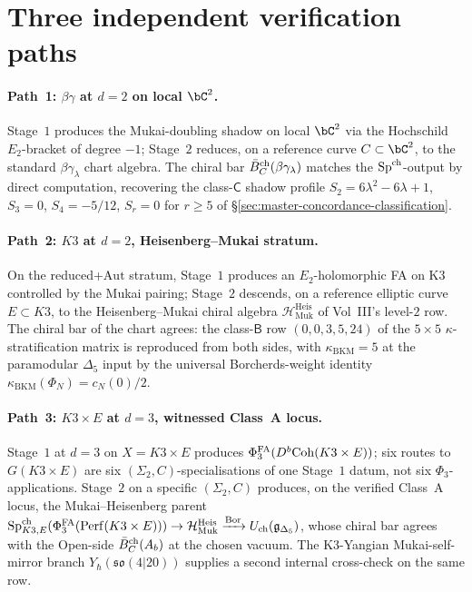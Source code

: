 \section{Three independent verification paths}
\label{sec:vert-level-2-verification}

\paragraph{Path~1: $\beta\gamma$ at $d=2$ on local $\bC^2$.}
Stage~$1$ produces the Mukai-doubling shadow on local $\bC^2$ via the
Hochschild $E_2$-bracket of degree $-1$; Stage~$2$ reduces, on a
reference curve $C\subset\bC^2$, to the standard $\beta\gamma_\lambda$
chart algebra. The chiral bar $\bar{B}^{\mathrm{ch}}_C(\beta\gamma_\lambda)$ matches
the $\mathrm{Sp}^{\mathrm{ch}}$-output by direct computation, recovering the class-$\mathsf{C}$
shadow profile $S_2=6\lambda^2-6\lambda+1$, $S_3=0$, $S_4=-5/12$,
$S_r=0$ for $r\geq 5$ of \S\ref{sec:master-concordance-classification}.

\paragraph{Path~2: $K3$ at $d=2$, Heisenberg--Mukai stratum.}
On the reduced+$\mathrm{Aut}$ stratum, Stage~$1$ produces an
$E_2$-holomorphic FA on K3 controlled by the Mukai pairing; Stage~$2$
descends, on a reference elliptic curve $E\subset K3$, to the
Heisenberg--Mukai chiral algebra $\mathcal H^{\mathrm{Heis}}_{\mathrm{Muk}}$
of Vol~III's level-$2$ row. The chiral bar of the chart agrees: the
class-$\mathsf{B}$ row $(0,0,3,5,24)$ of the $5\times5$
$\kappa$-stratification matrix is reproduced from both sides, with
$\kappa_{\mathrm{BKM}}=5$ at the paramodular $\Delta_5$ input by the
universal Borcherds-weight identity $\kappa_{\mathrm{BKM}}(\Phi_N)=c_N(0)/2$.

\paragraph{Path~3: $K3\times E$ at $d=3$, witnessed Class~A locus.}
Stage~$1$ at $d=3$ on $X=K3\times E$ produces $\Phi^{\mathrm{FA}}_3(D^b\mathrm{Coh}(K3\times E))$;
six routes to $G(K3\times E)$ are six $(\Sigma_2,C)$-specialisations
of one Stage~$1$ datum, not six $\Phi_3$-applications. Stage~$2$ on a
specific $(\Sigma_2,C)$ produces, on the verified Class~A locus, the
Mukai--Heisenberg parent
$\mathrm{Sp}^{\mathrm{ch}}_{K3,E}(\Phi^{\mathrm{FA}}_3(\mathrm{Perf}(K3\times E)))\to\mathcal H^{\mathrm{Heis}}_{\mathrm{Muk}}\xrightarrow{\mathrm{Bor}}U_{\mathrm{ch}}(\mathfrak g_{\Delta_5})$,
whose chiral bar agrees with the Open-side $\bar{B}^{\mathrm{ch}}_C(A_b)$ at the
chosen vacuum. The K3-Yangian Mukai-self-mirror branch
$Y_\hbar(\mathfrak{so}(4|20))$ supplies a second internal cross-check
on the same row.

